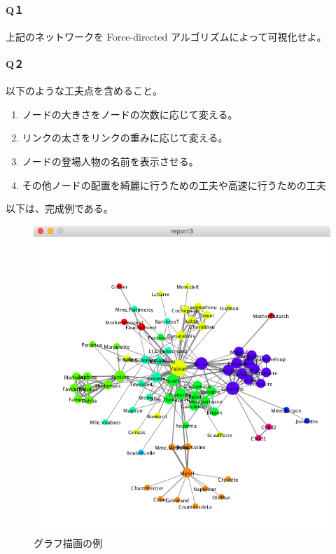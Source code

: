 \documentclass[dvipdfmx]{jsarticle}
\begin{document}
\paragraph{Q１}上記のネットワークを Force-directed アルゴリズムによって可視化せよ。
\paragraph{Q２}以下のような工夫点を含めること。
\begin{enumerate}
  \item ノードの大きさをノードの次数に応じて変える。
  \item リンクの太さをリンクの重みに応じて変える。
  \item ノードの登場人物の名前を表示させる。
  \item その他ノードの配置を綺麗に行うための工夫や高速に行うための工夫
\end{enumerate}
以下は、完成例である。
\begin{figure}[H]
  \centering
  \includegraphics[scale=0.4]{images/resultEx.png}
  \caption{グラフ描画の例}
\end{figure}
\end{document}
